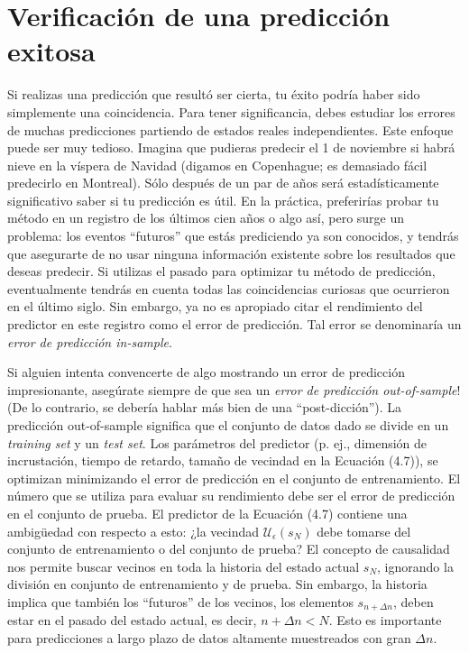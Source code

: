 \documentclass[10pt,a4paper]{book}
\begin{document}
\newpage

\section{Verificación de una predicción exitosa}

Si realizas una predicción que resultó ser cierta, tu éxito podría haber sido simplemente una coincidencia. Para tener significancia, debes estudiar los errores de muchas predicciones partiendo de estados reales independientes. Este enfoque puede ser muy tedioso. Imagina que pudieras predecir el 1 de noviembre si habrá nieve en la víspera de Navidad (digamos en Copenhague; es demasiado fácil predecirlo en Montreal). Sólo después de un par de años será estadísticamente significativo saber si tu predicción es útil. En la práctica, preferirías probar tu método en un registro de los últimos cien años o algo así, pero surge un problema: los eventos “futuros” que estás prediciendo ya son conocidos, y tendrás que asegurarte de no usar ninguna información existente sobre los resultados que deseas predecir. Si utilizas el pasado para optimizar tu método de predicción, eventualmente tendrás en cuenta todas las coincidencias curiosas que ocurrieron en el último siglo. Sin embargo, ya no es apropiado citar el rendimiento del predictor en este registro como el error de predicción. Tal error se denominaría un \textit{error de predicción in-sample}. 

\bigskip

Si alguien intenta convencerte de algo mostrando un error de predicción impresionante, asegúrate siempre de que sea un \textit{error de predicción out-of-sample}! (De lo contrario, se debería hablar más bien de una “post-dicción”). La predicción out-of-sample significa que el conjunto de datos dado se divide en un \textit{training set} y un \textit{test set}. Los parámetros del predictor (p. ej., dimensión de incrustación, tiempo de retardo, tamaño de vecindad en la Ecuación (4.7)), se optimizan minimizando el error de predicción en el conjunto de entrenamiento. El número que se utiliza para evaluar su rendimiento debe ser el error de predicción en el conjunto de prueba. El predictor de la Ecuación (4.7) contiene una ambigüedad con respecto a esto: ¿la vecindad \(\mathcal{U}_{\epsilon}(s_{N})\) debe tomarse del conjunto de entrenamiento o del conjunto de prueba? El concepto de causalidad nos permite buscar vecinos en toda la historia del estado actual \(s_{N}\), ignorando la división en conjunto de entrenamiento y de prueba. Sin embargo, la historia implica que también los “futuros” de los vecinos, los elementos \(s_{n+\Delta n}\), deben estar en el pasado del estado actual, es decir, \(n + \Delta n < N\). Esto es importante para predicciones a largo plazo de datos altamente muestreados con gran \(\Delta n\).
\end{document}
